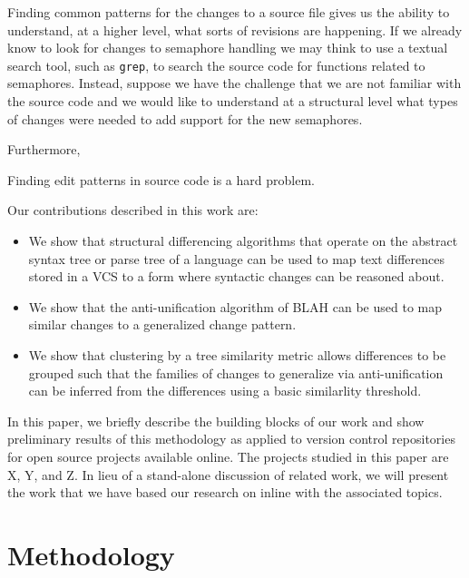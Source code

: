 \documentclass{acm_proc_article-sp}
\newcommand{\claim}[1]{#1}
\begin{document}
Finding common patterns for the changes to a source file gives us the ability
to understand, at a higher level, what sorts of revisions are happening. If we
already know to look for changes to semaphore handling we may think to use a
textual search tool, such as {\tt grep}, to search the source code for
functions related to semaphores. Instead, suppose we have the challenge that we
are not familiar with the source code and we would like to understand at a
structural level what types of changes were needed to add support for the new
semaphores.

Furthermore, 

\claim{Finding edit patterns in source code is a hard problem.}


Our contributions described in this work are:

\begin{itemize}

\item We show that structural differencing algorithms that operate on the abstract
syntax tree or parse tree of a language can be used to map text differences stored in
a VCS to a form where syntactic changes can be reasoned about.

\item We show that the anti-unification algorithm of BLAH can be used to map
similar changes to a generalized change pattern.

\item We show that clustering by a tree similarity metric allows differences to be grouped
such that the families of changes to generalize via anti-unification can be inferred from
the differences using a basic similarlity threshold.

\end{itemize}

In this paper, we briefly describe the building blocks of our work and show preliminary results
of this methodology as applied to version control repositories for open source projects available
online.  The projects studied in this paper are X, Y, and Z.  In lieu of a stand-alone discussion of
related work, we will present the work that we have based our research on inline with the associated
topics.

\section{Methodology}
\end{document}
